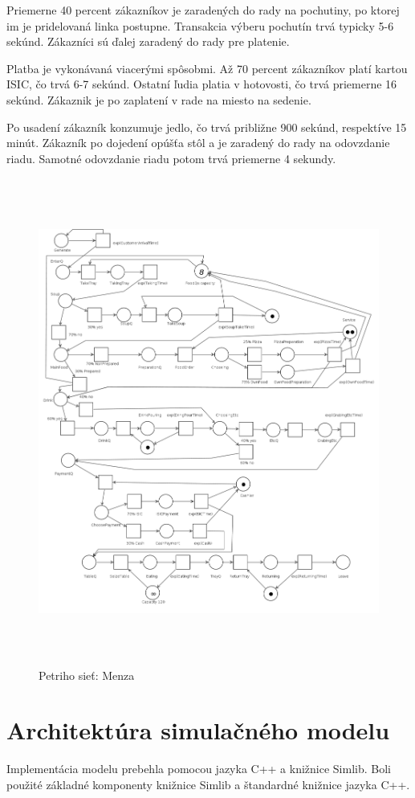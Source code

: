 \documentclass{article}
\begin{document}
Priemerne 40 percent zákazníkov je zaradených do rady na pochutiny, po ktorej im je pridelovaná linka postupne. Transakcia výberu pochutín trvá typicky 5-6 sekúnd. Zákazníci sú ďalej zaradený do rady pre platenie.

Platba je vykonávaná viacerými spôsobmi. Až 70 percent zákazníkov platí kartou ISIC, čo trvá 6-7 sekúnd. Ostatní ľudia platia v hotovosti, čo trvá priemerne 16 sekúnd. Zákaznik je po zaplatení v rade na miesto na sedenie.

Po usadení zákazník konzumuje jedlo, čo trvá približne 900 sekúnd, respektíve 15 minút. Zákazník po dojedení opúšťa stôl a je zaradený do rady na odovzdanie riadu. Samotné odovzdanie riadu potom trvá priemerne 4 sekundy.

\begin{figure}
  \centering
  \includegraphics[width=\textwidth,height=16cm,keepaspectratio]{petri_net_menza.png}
  \caption{Petriho sieť: Menza}
  \label{fig:petri_net_canteen}
\end{figure}

\section{Architektúra simulačného modelu}
Implementácia modelu prebehla pomocou jazyka C++ a knižnice Simlib. Boli použité základné komponenty knižnice Simlib a štandardné knižnice jazyka C++.
\end{document}
